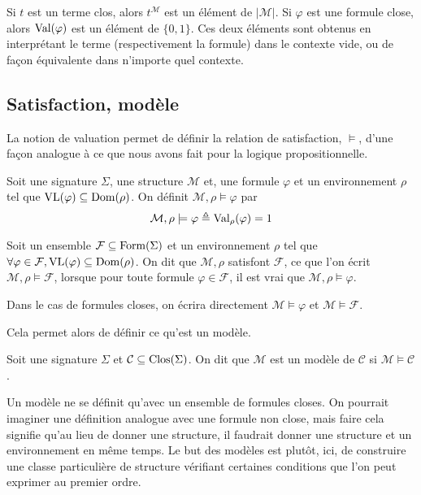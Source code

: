 \begin{definition}
  Si $t$ est un terme clos, alors $t^{\mathcal M}$ est un élément de
  $|\mathcal M|$. Si $\varphi$ est une formule close, alors $\operatorname{Val}(\varphi)$ est
  un élément de $\{0,1\}$. Ces deux éléments sont obtenus en interprétant le
  terme (respectivement la formule) dans le contexte vide, ou de façon
  équivalente dans n'importe quel contexte.
\end{definition}

\subsection{Satisfaction, modèle}

La notion de valuation permet de définir la relation de satisfaction, $\models$,
d'une façon analogue à ce que nous avons fait pour la logique propositionnelle.

\begin{definition}[Satisfaction]
  Soit une signature $\Sigma$, une structure $\mathcal M$ et, une formule
  $\varphi$ et un environnement $\rho$ tel que $\operatorname{VL}(\varphi)\subseteq\operatorname{Dom}(\rho)$.
  On définit $\mathcal M,\rho\models \varphi$ par
  \[\mathcal M,\rho\models \varphi \triangleq \operatorname{Val}_\rho(\varphi) = 1\]

  Soit un ensemble $\mathcal F\subseteq\operatorname{Form}(\Sigma)$ et un environnement
  $\rho$ tel que $\forall \varphi\in\mathcal F, \operatorname{VL}(\varphi)\subseteq\operatorname{Dom}(\rho)$.
  On dit que $\mathcal M,\rho$ satisfont $\mathcal F$, ce que l'on écrit
  $\mathcal M,\rho\models\mathcal F$, lorsque pour toute formule
  $\varphi\in\mathcal F$, il est vrai que $\mathcal M,\rho\models \varphi$.

  Dans le cas de formules closes, on écrira directement
  $\mathcal M\models\varphi$ et $\mathcal M\models \mathcal F$.
\end{definition}

Cela permet alors de définir ce qu'est un modèle.

\begin{definition}[Modèle]
  Soit une signature $\Sigma$ et $\mathcal C\subseteq\operatorname{Clos}(\Sigma)$. On dit que
  $\mathcal M$ est un modèle de $\mathcal C$ si $\mathcal M\models \mathcal C$.
\end{definition}

Un modèle ne se définit qu'avec un ensemble de formules closes. On pourrait
imaginer une définition analogue avec une formule non close, mais faire cela
signifie qu'au lieu de donner une structure, il faudrait donner une structure et
un environnement en même temps. Le but des modèles est plutôt, ici, de construire
une classe particulière de structure vérifiant certaines conditions que l'on peut
exprimer au premier ordre.

